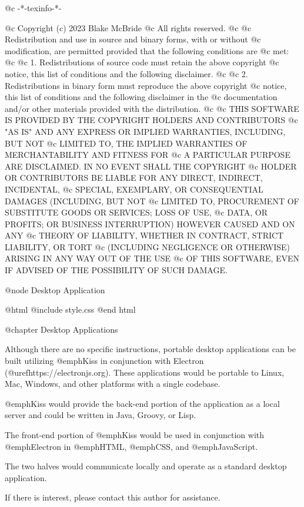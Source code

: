 @c -*-texinfo-*-

@c  Copyright (c) 2023 Blake McBride
@c  All rights reserved.
@c
@c  Redistribution and use in source and binary forms, with or without
@c  modification, are permitted provided that the following conditions are
@c  met:
@c
@c  1. Redistributions of source code must retain the above copyright
@c  notice, this list of conditions and the following disclaimer.
@c
@c  2. Redistributions in binary form must reproduce the above copyright
@c  notice, this list of conditions and the following disclaimer in the
@c  documentation and/or other materials provided with the distribution.
@c
@c  THIS SOFTWARE IS PROVIDED BY THE COPYRIGHT HOLDERS AND CONTRIBUTORS
@c  "AS IS" AND ANY EXPRESS OR IMPLIED WARRANTIES, INCLUDING, BUT NOT
@c  LIMITED TO, THE IMPLIED WARRANTIES OF MERCHANTABILITY AND FITNESS FOR
@c  A PARTICULAR PURPOSE ARE DISCLAIMED. IN NO EVENT SHALL THE COPYRIGHT
@c  HOLDER OR CONTRIBUTORS BE LIABLE FOR ANY DIRECT, INDIRECT, INCIDENTAL,
@c  SPECIAL, EXEMPLARY, OR CONSEQUENTIAL DAMAGES (INCLUDING, BUT NOT
@c  LIMITED TO, PROCUREMENT OF SUBSTITUTE GOODS OR SERVICES; LOSS OF USE,
@c  DATA, OR PROFITS; OR BUSINESS INTERRUPTION) HOWEVER CAUSED AND ON ANY
@c  THEORY OF LIABILITY, WHETHER IN CONTRACT, STRICT LIABILITY, OR TORT
@c  (INCLUDING NEGLIGENCE OR OTHERWISE) ARISING IN ANY WAY OUT OF THE USE
@c  OF THIS SOFTWARE, EVEN IF ADVISED OF THE POSSIBILITY OF SUCH DAMAGE.


@node Desktop Application

@html
@include style.css
@end html

@chapter Desktop Applications

Although there are no specific instructions, portable desktop
applications can be built utilizing @emph{Kiss} in conjunction with
Electron (@uref{https://electronjs.org}).  These
applications would be portable to Linux, Mac, Windows, and other
platforms with a single codebase.

@emph{Kiss} would provide the back-end portion of the application as a
local server and could be written in Java, Groovy, or Lisp.  

The front-end portion of @emph{Kiss} would be used in conjunction with
@emph{Electron} in @emph{HTML}, @emph{CSS}, and @emph{JavaScript}.

The two halves would communicate locally and operate as a standard
desktop application.

If there is interest, please contact this author for assistance.
